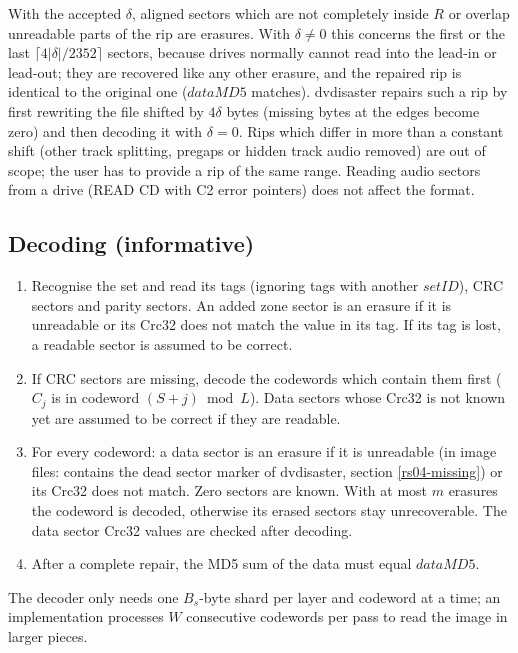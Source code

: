 With the accepted $\delta$, aligned sectors which are not completely inside
$R$ or overlap unreadable parts of the rip are erasures. With $\delta \ne 0$
this concerns the first or the last $\lceil 4|\delta| / 2352 \rceil$ sectors,
because drives normally cannot read into the lead-in or lead-out; they are
recovered like any other erasure, and the repaired rip is identical to the
original one ($dataMD5$ matches). dvdisaster repairs such a rip by first
rewriting the file shifted by $4\delta$ bytes (missing bytes at the edges
become zero) and then decoding it with $\delta = 0$. Rips which differ in more than a constant
shift (other track splitting, pregaps or hidden track audio removed) are out
of scope; the user has to provide a rip of the same range. Reading audio
sectors from a drive (READ CD with C2 error pointers) does not affect the
format.

\subsection{Decoding (informative)}
\label{rs04-decode}

\begin{enumerate}
\item Recognise the set and read its tags (ignoring tags with another
  $setID$), CRC sectors and parity sectors.
  An added zone sector is an erasure if it is unreadable or its Crc32 does not
  match the value in its tag. If its tag is lost, a readable sector is
  assumed to be correct.
\item If CRC sectors are missing, decode the codewords which contain them
  first ($C_j$ is in codeword $(S+j) \bmod L$). Data sectors whose Crc32 is
  not known yet are assumed to be correct if they are readable.
\item For every codeword: a data sector is an erasure if it is unreadable
  (in image files: contains the dead sector marker of dvdisaster, section
  \ref{rs04-missing}) or its
  Crc32 does not match. Zero sectors are known. With at most $m$
  erasures the codeword is decoded, otherwise its erased sectors stay
  unrecoverable. The data sector Crc32 values are checked after decoding.
\item After a complete repair, the MD5 sum of the data must equal
  $dataMD5$.
\end{enumerate}

The decoder only needs one $B_s$-byte shard per layer and codeword at a
time; an implementation processes $W$ consecutive codewords per pass to read
the image in larger pieces.

